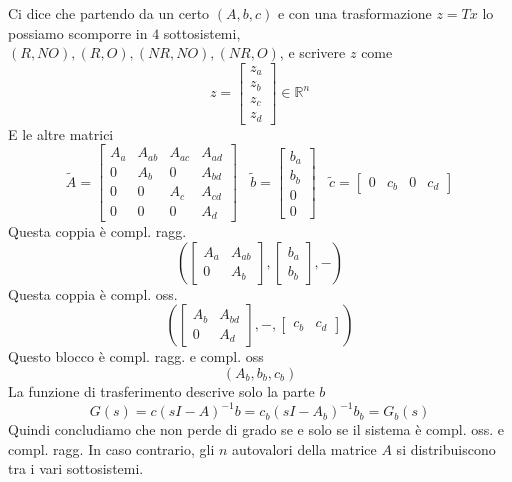 Ci dice che partendo da un certo $(A,b,c)$ e con una trasformazione $z=Tx$ lo possiamo scomporre in $4$ sottosistemi, $(R,NO) ,(R,O) ,(NR,NO) ,(NR,O)$, e scrivere $z$ come
\begin{equation*}
	z=\begin{bmatrix}
	z_a\\
	z_b\\
	z_c\\
	z_d
	\end{bmatrix} \in \mathbb{R}^n
\end{equation*}
E le altre matrici
\begin{equation*}
	\tilde{A} =\begin{bmatrix}
	A_a & A_{ab} & A_{ac} & A_{ad}\\
	0 & A_b & 0 & A_{bd}\\
	0 & 0 & A_c & A_{cd}\\
	0 & 0 & 0 & A_d
	\end{bmatrix} \ \ \ \ \tilde{b} =\begin{bmatrix}
	b_a\\
	b_b\\
	0\\
	0
	\end{bmatrix} \ \ \ \ \tilde{c} =\begin{bmatrix}
	0 & c_b & 0 & c_d
	\end{bmatrix}
\end{equation*}
Questa coppia è compl. ragg.
\begin{equation*}
	\left(\begin{bmatrix}
	A_a & A_{ab}\\
	0 & A_b
	\end{bmatrix} ,\begin{bmatrix}
	b_a\\
	b_b
	\end{bmatrix} ,-\right)
\end{equation*}
Questa coppia è compl. oss.
\begin{equation*}
	\left(\begin{bmatrix}
	A_b & A_{bd}\\
	0 & A_d
	\end{bmatrix} ,-,\begin{bmatrix}
	c_b & c_d
	\end{bmatrix}\right)
\end{equation*}
Questo blocco è compl. ragg. e compl. oss
\begin{equation*}
	(A_b ,b_b ,c_b)
\end{equation*}
La funzione di trasferimento descrive solo la parte $b$
\begin{equation*}
	G(s) =c(sI-A)^{-1} b=c_b(sI-A_b)^{-1} b_b =G_b(s)
\end{equation*}
Quindi concludiamo che non perde di grado se e solo se il sistema è compl. oss. e compl. ragg. In caso contrario, gli $n$ autovalori della matrice $A$ si distribuiscono tra i vari sottosistemi.

